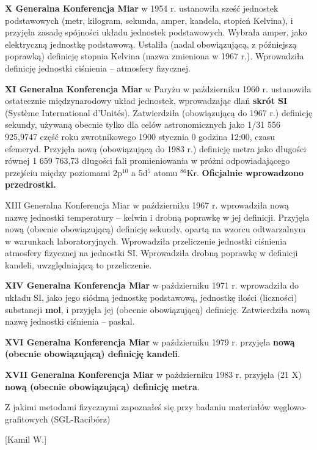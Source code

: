 \documentclass{article}
\begin{document}
\begin{enumerate}
{\bf X Generalna Konferencja Miar} w 1954 r. ustanowiła sześć jednostek podstawowych (metr, kilogram, sekunda, amper, kandela, stopień Kelvina), i przyjęła zasadę spójności układu jednostek podstawowych. Wybrała amper, jako elektryczną jednostkę podstawową. Ustaliła (nadal obowiązującą, z późniejszą poprawką) definicję stopnia Kelvina (nazwa zmieniona w 1967 r.). Wprowadziła definicję jednostki ciśnienia – atmosfery fizycznej.

{\bf XI Generalna Konferencja Miar} w Paryżu w październiku 1960 r. ustanowiła ostatecznie międzynarodowy układ jednostek, wprowadzając dlań {\bf skrót SI} (Système International d'Unités). Zatwierdziła (obowiązującą do 1967 r.) definicję sekundy, używaną obecnie tylko dla celów astronomicznych jako 1/31 556 925,9747 część roku zwrotnikowego 1900 stycznia 0 godzina 12:00, czasu efemeryd. Przyjęła nową (obowiązującą do 1983 r.) definicję metra jako długości równej 1 659 763,73 długości fali promieniowania w próżni odpowiadającego przejściu między poziomami $2$p$^{10}$ a 5d$^5$ atomu $^{86}$Kr. {\bf Oficjalnie wprowadzono przedrostki.}


XIII Generalna Konferencja Miar w październiku 1967 r. wprowadziła nową nazwę jednostki temperatury – kelwin i drobną poprawkę w jej definicji. Przyjęła nową (obecnie obowiązującą) definicję sekundy, opartą na wzorcu odtwarzalnym w warunkach laboratoryjnych. Wprowadziła przeliczenie jednostki ciśnienia atmosfery fizycznej na jednostki SI. Wprowadziła drobną poprawkę w definicji kandeli, uwzględniającą to przeliczenie.

{\bf XIV Generalna Konferencja Miar} w październiku 1971 r. wprowadziła do układu SI, jako jego siódmą jednostkę podstawową, jednostkę ilości (liczności) substancji {\bf mol}, i przyjęła jej (obecnie obowiązującą) definicję. Zatwierdziła nową nazwę jednostki ciśnienia – paskal.

{\bf XVI Generalna Konferencja Miar} w październiku 1979 r. przyjęła {\bf nową (obecnie obowiązującą) definicję kandeli}.

{\bf XVII Generalna Konferencja Miar} w październiku 1983 r. przyjęła (21 X) {\bf nową (obecnie obowiązującą) definicję metra}.

 
 




{\Large \bf  \item Z jakimi metodami fizycznymi zapoznałeś się przy badaniu materiałów węglowo-
grafitowych (SGL-Racibórz)} [Kamil W.]




\end{enumerate}
\end{document}
